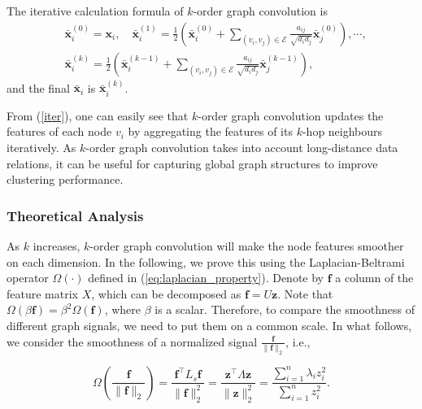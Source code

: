 \documentclass{article}
\begin{document}
The iterative calculation formula of $k$-order graph convolution is
\begin{equation}\label{iter}
\begin{split}
&\bm {\bar{x}}_i^{(0)}={\bm x_i}, \quad \bm {\bar{x}}_i^{(1)}=\frac12 \left(\bm {\bar{x}}_i^{(0)}+\sum_{(v_i,v_j)\in \mathcal{E}}\frac{a_{ij}}{\sqrt{d_id_j}} \bm {\bar{x}}_j^{(0)}\right), \cdots,\\
&\bm {\bar{x}}_i^{(k)}=\frac12 \left(\bm {\bar{x}}_i^{(k-1)}+\sum_{(v_i,v_j)\in \mathcal{E}}\frac{a_{ij}}{\sqrt{d_id_j}} \bm {\bar{x}}_j^{(k-1)}\right),
\end{split}
\end{equation}
and the final $\bm {\bar{x}}_i$ is $\bm {\bar{x}}_i^{(k)}$.

From (\ref{iter}), one can easily see that $k$-order graph convolution updates the features of each node $v_i$ by aggregating the features of its $k$-hop neighbours iteratively. As $k$-order graph convolution takes into account long-distance data relations, it can be useful for capturing global graph structures to improve clustering performance.

\subsubsection{Theoretical Analysis}
As $k$ increases, $k$-order graph convolution will make the node features smoother on each dimension. In the following, we prove this using the Laplacian-Beltrami operator $\Omega(\cdot)$ defined in (\ref{eq:laplacian_property}).
Denote by $\bm f$ a column of the feature matrix $X$, which can be decomposed as $\bm f=U \bm z$. Note that $\Omega(\beta\bm f)=\beta^2\Omega(\bm f)$, where $\beta$ is a scalar. Therefore, to compare the smoothness of different graph signals, we need to put them on a common scale. In what follows, we consider the smoothness of a normalized signal $\frac{\bm f}{\lVert \bm f \rVert_2}$, i.e.,


\begin{equation}
    \Omega\left(\frac{\bm f}{\lVert \bm f \rVert_2}\right)
    = \frac{\bm f^\top L_s \bm f}{\lVert \bm f \rVert_2^2}
    = \frac{\bm z^\top\Lambda \bm z}{\lVert \bm z\rVert_2^2}
    = \frac{\sum_{i=1}^n \lambda_i z_{i}^2}{\sum_{i=1}^n{z_i^2}}.
\end{equation}
\end{document}
